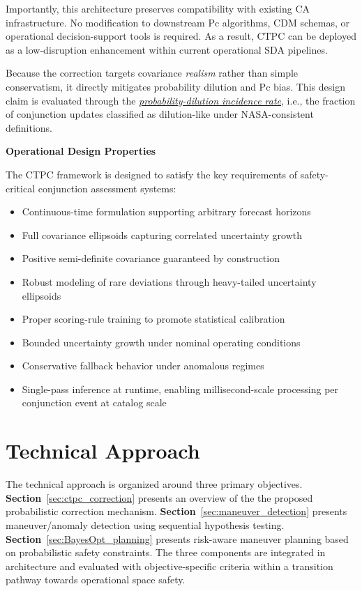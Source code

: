 \documentclass[10pt]{article}
\begin{document}
Importantly, this architecture preserves compatibility with existing CA infrastructure. No modification to downstream Pc algorithms, CDM schemas, or operational decision-support tools is required. As a result, CTPC can be deployed as a low-disruption enhancement within current operational SDA pipelines.

Because the correction targets covariance \textit{realism} rather than simple conservatism, it directly mitigates probability dilution and Pc bias. This design claim is evaluated through the \hyperref[itm:pdi]{\textit{probability-dilution incidence rate}}, i.e., the fraction of conjunction updates classified as dilution-like under NASA-consistent definitions.

\textbf{Operational Design Properties}

The CTPC framework is designed to satisfy the key requirements of safety-critical conjunction assessment systems:

\begin{itemize}
\item Continuous-time formulation supporting arbitrary forecast horizons
\item Full covariance ellipsoids capturing correlated uncertainty growth
\item Positive semi-definite covariance guaranteed by construction
\item Robust modeling of rare deviations through heavy-tailed uncertainty ellipsoids
\item Proper scoring-rule training to promote statistical calibration
\item Bounded uncertainty growth under nominal operating conditions
\item Conservative fallback behavior under anomalous regimes
\item Single-pass inference at runtime, enabling millisecond-scale processing per conjunction event at catalog scale
\end{itemize}

\section{Technical Approach}

The technical approach is organized around three primary objectives. \textbf{Section}~\ref{sec:ctpc_correction} presents an overview of the the proposed probabilistic correction mechanism. \textbf{Section}~\ref{sec:maneuver_detection} presents maneuver/anomaly detection using sequential hypothesis testing. \textbf{Section}~\ref{sec:BayesOpt_planning} presents risk-aware maneuver planning based on probabilistic safety constraints. The three components are integrated in architecture and evaluated with objective-specific criteria within a transition pathway towards operational space safety.
\end{document}
